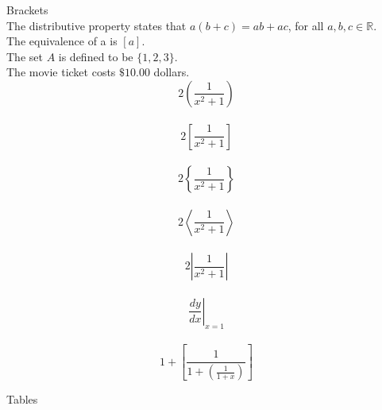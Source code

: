 \documentclass[11pt]{article}
\begin{document}
Brackets \\[10pt]
The distributive property states that $a(b+c)=ab+ac$, 
for all $a, b, c \in \mathbb{R}$. \\[6pt]
The equivalence of a is $[a]$.\\[6pt]
The set $A$ is defined to be $\{1,2,3\}$.\\[6pt]
The movie ticket costs $\$10.00$ dollars. \\[6pt]

$$2\left(\frac{1}{x^2+1}\right)$$ \\[2pt]
$$2\left[\frac{1}{x^2+1}\right]$$ \\[2pt]
$$2\left\{\frac{1}{x^2+1}\right\}$$ \\[2pt]
$$2\left\langle  \frac{1}{x^2+1}\right\rangle  $$ \\[2pt]
$$2\left|  \frac{1}{x^2+1}\right|  $$ \\[2pt]
$$\left.\frac{dy}{dx}\right|_{x=1}$$ \\[2pt]
$$1+\left[\frac{1}{1+\left(\frac{1}{1+x}\right)}\right]$$

Tables \\[10pt]
\end{document}
